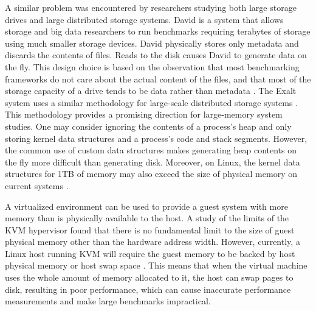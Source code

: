 \documentclass[twocolumn,11pt]{article}
\begin{document}
A similar problem was encountered by researchers studying both large storage
drives and large distributed storage systems. David is a system that allows
storage and big data researchers to run benchmarks requiring terabytes of
storage using much smaller storage devices.
David physically stores only
metadata and discards the contents of files. Reads to the disk causes David to
generate data on the fly. This design choice is based on the observation that
most benchmarking frameworks do not care about the actual content of the files,
and that most of the storage capacity of a drive tends to be data rather than
metadata \cite{david}. The Exalt system uses a similar methodology for
large-scale distributed storage systems \cite{exalt}. This methodology provides
a promising direction for large-memory system studies. One may consider ignoring
the contents of a process’s heap and only storing kernel data structures and a
process’s code and stack segments. However, the common use of custom data
structures makes generating heap contents on the fly
more difficult than generating disk. Moreover, on Linux, the kernel data structures for 1TB
of memory may also exceed the size of physical memory on current systems
\cite{simics}.

A virtualized environment can be used to provide a guest system with more memory
than is physically available to the host. A study of the limits of the KVM
hypervisor found that there is no fundamental limit to the size of guest
physical memory other than the hardware address width. However, currently, a
Linux host running KVM will require the guest memory to be backed by host
physical memory or host swap space \cite{ibmkvm}.  This means that when the
virtual machine uses the whole amount of memory allocated to it, the host can
swap pages to disk, resulting in poor performance, which can cause inaccurate
performance measurements and make large
benchmarks impractical.
\end{document}
